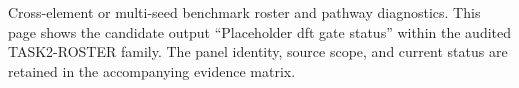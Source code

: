 Cross-element or multi-seed benchmark roster and pathway diagnostics. This page shows the candidate output ``Placeholder dft gate status'' within the audited TASK2-ROSTER family. The panel identity, source scope, and current status are retained in the accompanying evidence matrix.
